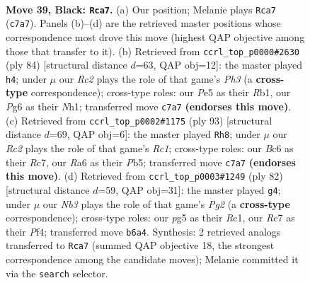 \documentclass[11pt]{article}
\begin{document}
\clearpage

\begin{figure}[p]\centering
\begin{subfigure}{0.46\textwidth}\centering
\resizebox{\linewidth}{!}{%
\newchessgame
\chessboard[
  setfen={5k2/2r2p1p/rnbN2p1/p3p1P1/8/1P2P1RP/P3K1P1/RN6 b - - 0 39},
  showmover=false,
  pgfstyle=straightmove, color=movearrow, markmove={c7-a7}
]}
\caption{}
\end{subfigure}\hfill
\begin{subfigure}{0.46\textwidth}\centering
\resizebox{\linewidth}{!}{%
\newchessgame
\chessboard[
  setfen={1r1r2k1/7p/1n4p1/1B1p2Pn/2pPp3/4P2P/5PK1/RR5N w - - 5 43},
  showmover=false,
  pgfstyle=straightmove, color=movearrow, markmove={h3-h4}
]}
\caption{}
\end{subfigure}
\\[4pt]
\begin{subfigure}{0.46\textwidth}\centering
\resizebox{\linewidth}{!}{%
\newchessgame
\chessboard[
  setfen={2r5/2r2p2/p1Np1k2/Pp1P2p1/n4p2/5P1P/1P2R1PK/4R3 b - - 25 47},
  showmover=false,
  pgfstyle=straightmove, color=movearrow, markmove={c8-h8}
]}
\caption{}
\end{subfigure}\hfill
\begin{subfigure}{0.46\textwidth}\centering
\resizebox{\linewidth}{!}{%
\newchessgame
\chessboard[
  setfen={r4r2/1R3ppk/p1N1p3/P2p1n1p/3P1P2/1P5P/6P1/2R3K1 w - - 2 42},
  showmover=false,
  pgfstyle=straightmove, color=movearrow, markmove={g2-g4}
]}
\caption{}
\end{subfigure}
\caption{\textbf{Move 39, Black: \texttt{Rca7}.} (a) Our position; Melanie plays \texttt{Rca7} (\texttt{c7a7}). Panels (b)--(d) are the retrieved master positions whose correspondence most drove this move (highest QAP objective among those that transfer to it). (b) Retrieved from \texttt{ccrl\_top\_p0000\#2630} (ply 84) [structural distance $d$=63, QAP obj=12]: the master played \texttt{h4}; under $\mu$ our \emph{Rc2} plays the role of that game's \emph{Ph3} (a \textbf{cross-type} correspondence); cross-type roles: our \emph{P}e5 as their \emph{R}b1, our \emph{P}g6 as their \emph{N}h1; transferred move \texttt{c7a7} \textbf{(endorses this move)}. (c) Retrieved from \texttt{ccrl\_top\_p0002\#1175} (ply 93) [structural distance $d$=69, QAP obj=6]: the master played \texttt{Rh8}; under $\mu$ our \emph{Rc2} plays the role of that game's \emph{Rc1}; cross-type roles: our \emph{B}c6 as their \emph{R}c7, our \emph{R}a6 as their \emph{P}b5; transferred move \texttt{c7a7} \textbf{(endorses this move)}. (d) Retrieved from \texttt{ccrl\_top\_p0003\#1249} (ply 82) [structural distance $d$=59, QAP obj=31]: the master played \texttt{g4}; under $\mu$ our \emph{Nb3} plays the role of that game's \emph{Pg2} (a \textbf{cross-type} correspondence); cross-type roles: our \emph{p}g5 as their \emph{R}c1, our \emph{R}c7 as their \emph{P}f4; transferred move \texttt{b6a4}. Synthesis: 2 retrieved analogs transferred to \texttt{Rca7} (summed QAP objective 18, the strongest correspondence among the candidate moves); Melanie committed it via the \texttt{search} selector.}
\label{fig:thought-m77}
\end{figure}
\end{document}
